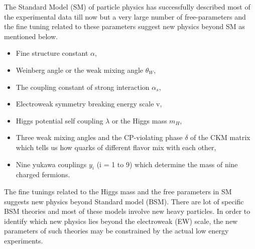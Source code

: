 \documentclass[final,3p]{CSP}
\begin{document}
The Standard Model (SM) of particle physics has successfully described most of the experimental data till now but a very large 
number of free-parameters and the fine tuning related to these parameters suggest new physics beyond SM as mentioned below.
\begin{itemize}
\item{Fine structure constant $\alpha$},
\item{Weinberg angle or the weak mixing angle $\theta_W$},
\item{The coupling constant of strong interaction $\alpha_s$},
\item{Electroweak symmetry breaking energy scale v},
\item{ Higgs potential self coupling $\lambda$ or the Higgs mass $m_H$},
\item{Three weak mixing angles and the CP-violating phase $\delta$ of the CKM matrix which tells us how quarks of different flavor mix with each other},
\item{Nine yukawa couplings $y_i$ (i = 1 to 9) which determine the mass of nine charged fermions}.
\end{itemize}
 The fine 
tunings related to the Higgs 
mass and the free parameters in SM suggests new physics beyond Standard model (BSM). There are lot of specific 
BSM theories and most of these 
models involve new heavy particles. In order to identify which new physics lies beyond the 
electroweak (EW) scale, the new parameters 
of such theories may be constrained by the actual low energy experiments.
\end{document}
